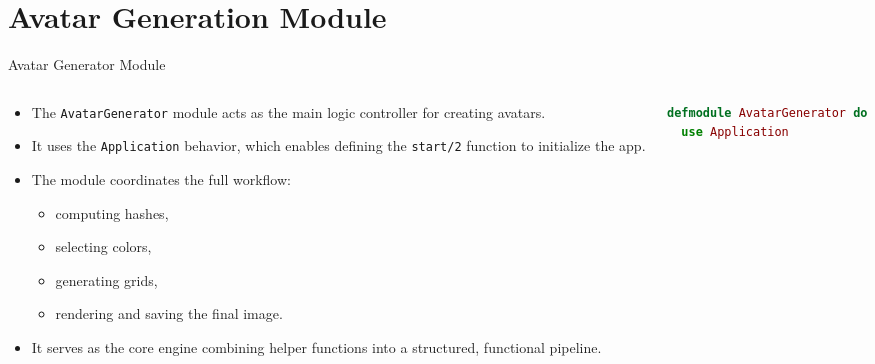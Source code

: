 \documentclass[aspectratio=169, table]{beamer}
\begin{document}
\section{Avatar Generation Module}
\begin{frame}[fragile]{Avatar Generator Module}
\vspace{10pt}
\begin{columns}[T,totalwidth=\textwidth]
  \begin{column}{0.52\textwidth}
    \small
    \begin{itemize}
      \item The \texttt{AvatarGenerator} module acts as the main logic controller for creating avatars.
      \item It uses the \texttt{Application} behavior, which enables defining the \texttt{start/2} function to initialize the app.
      \item The module coordinates the full workflow:
      \begin{itemize}
        \item computing hashes,
        \item selecting colors,
        \item generating grids,
        \item rendering and saving the final image.
      \end{itemize}
      \item It serves as the core engine combining helper functions into a structured, functional pipeline.
    \end{itemize}
  \end{column}

  \begin{column}{0.45\textwidth}
    \begin{lstlisting}[language=Elixir, 
      caption={Definition of the Avatar Generator module in \texttt{lib/avatar.ex}}, 
      basicstyle=\ttfamily\small]
defmodule AvatarGenerator do
  use Application
    \end{lstlisting}
  \end{column}
\end{columns}
\end{frame}
\end{document}
